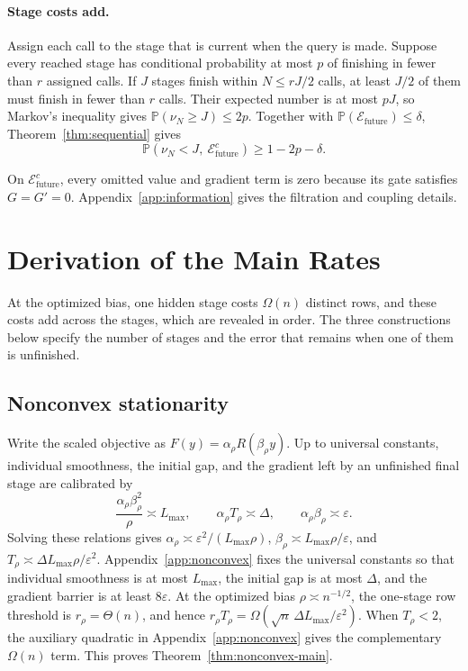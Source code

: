 \documentclass{article}
\theoremstyle{definition}
\newcommand{\Prob}{\mathbb{P}}
\newcommand{\cEfuture}{\mathcal{E}_{\mathrm{future}}}
\begin{document}
\paragraph{Stage costs add.}
Assign each call to the stage that is current when the query is made.  Suppose
every reached stage has conditional probability at most $p$ of finishing in
fewer than $r$ assigned calls.  If $J$ stages finish within $N\le rJ/2$ calls,
at least $J/2$ of them must finish in fewer than $r$ calls.  Their expected
number is at most $pJ$, so Markov's inequality gives
$\Prob(\nu_N\ge J)\le2p$.  Together with
$\Prob(\cEfuture)\le\delta$, Theorem~\ref{thm:sequential} gives
\begin{equation}
 \Prob(\nu_N<J,\ \cEfuture^c)\ge1-2p-\delta.
\end{equation}

On $\cEfuture^c$, every omitted value and gradient term is zero because its gate
satisfies $G=G'=0$.  Appendix~\ref{app:information} gives the filtration and coupling
details.

\section{Derivation of the Main Rates}
\label{sec:hard-chains}

At the optimized bias, one hidden stage costs $\Omega(n)$ distinct rows, and
these costs add across the stages, which are revealed in order.  The three constructions
below specify the number of stages and the error that remains when one of them
is unfinished.

\subsection{Nonconvex stationarity}

Write the scaled objective as $F(y)=\alpha_\rho R(\beta_\rho y)$.  Up to
universal constants, individual smoothness, the initial gap, and the gradient
left by an unfinished final stage are calibrated by
\begin{equation}
 \frac{\alpha_\rho\beta_\rho^2}{\rho}\asymp L_{\max},
 \qquad
 \alpha_\rho T_\rho\asymp\Delta,
 \qquad
 \alpha_\rho\beta_\rho\asymp\varepsilon.
 \label{eq:main-nonconvex-calibration}
\end{equation}
Solving these relations gives
$\alpha_\rho\asymp\varepsilon^2/(L_{\max}\rho)$,
$\beta_\rho\asymp L_{\max}\rho/\varepsilon$, and
$T_\rho\asymp\Delta L_{\max}\rho/\varepsilon^2$.
Appendix~\ref{app:nonconvex} fixes the universal constants so that individual
smoothness is at most $L_{\max}$, the initial gap is at most $\Delta$, and the
gradient barrier is at least $8\varepsilon$.  At the optimized bias
$\rho\asymp n^{-1/2}$, the one-stage
row threshold is $r_\rho=\Theta(n)$, and hence
$r_\rho T_\rho=\Omega(\sqrt n\,\Delta L_{\max}/\varepsilon^2)$.
When $T_\rho<2$, the auxiliary quadratic in Appendix~\ref{app:nonconvex} gives
the complementary $\Omega(n)$ term.  This proves
Theorem~\ref{thm:nonconvex-main}.
\end{document}
